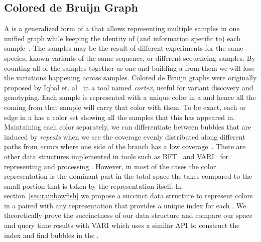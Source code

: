 \subsection{Colored de Bruijn Graph}
A \cdbg is a generalized form of a \dbg that allows representing multiple samples in one unified graph while keeping the identity of (and information specific to) each sample~\cite{Iqbal2012Novo}. The samples may be the result of different experiments for the same species, known variants of the same sequence, or different sequencing samples. By counting all of the samples together as one and building a \dbg from them we will lose the variations happening across samples. Colored de Bruijn graphs were originally proposed by Iqbal et. al~\cite{Iqbal2012Novo}  in a tool named \emph{cortex}, useful for variant discovery and genotyping. Each sample is represented with a unique color in a \cdbg and hence all the \kmers coming from that sample will carry that color with them. To be exact, each \kmer or edge in a \cdbg has a color set showing all the samples that this \kmer has appeared in. Maintaining each color separately, we can differentiate between bubbles that are induced by \emph{repeats} when we see the coverage evenly distributed along different paths from \emph{errors} where one side of the branch has a low coverage~\cite{Iqbal2012Novo}. There are other data structures implemented in tools such as BFT~\cite{holley2016bloom} and VARI~\cite{MuggliBoNo17} for representing and processing \cdbgs. However, in most of the cases the color representation is the dominant part in the total space the \cdbg takes compared to the small portion that is taken by the \dbg representation itself. In section~\ref{sec:rainbowfish} we propose a succinct data structure to represent colors in a \cdbg paired with any \dbg representation that provides a unique index for each \kmer. We theoretically prove the succinctness of our data structure and compare our space and query time results with VARI which uses a similar API to construct the index and find bubbles in the \cdbg.




